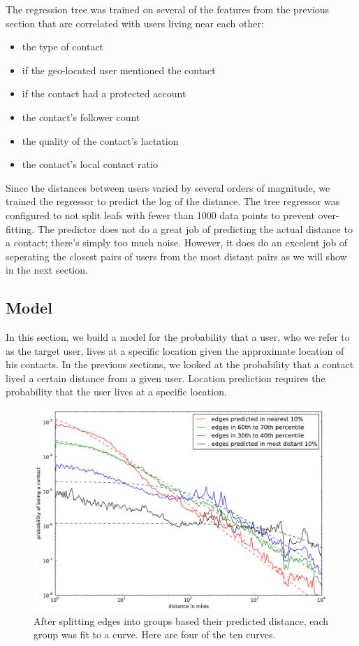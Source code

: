The regression tree was trained on several of the features from the previous
section that are correlated with users living near each other:
\begin{itemize}
\item the type of contact
\item if the geo-located user mentioned the contact
\item if the contact had a protected account
\item the contact's follower count
\item the quality of the contact's lactation
\item the contact's local contact ratio
\end{itemize}
%
Since the distances between users varied by several orders of magnitude, we
trained the regressor to predict the log of the distance.
%
The tree regressor was configured to not split leafs with fewer than 1000 data
points to prevent over-fitting.
%
The predictor does not do a great job of predicting the actual distance to a
contact; there's simply too much noise.
%
However, it does do an excelent job of seperating the closest pairs of users
from the most distant pairs as we will show in the next section.


\subsection{Model}
\label{sec:model}

In this section, we build a model for the probability that a user, who we refer
to as the target user, lives at a specific location given the approximate
location of his contacts.
%
In the previous sections, we looked at the probability that a contact lived a
certain distance from a given user.
%
Location prediction requires the probability that the user lives at a specific
location.


\begin{figure}[tb]
\centering
\includegraphics[width=\linewidth]{figures/near_prob_fit.pdf}
\caption{
After splitting edges into groups based their predicted distance, each group was fit to a curve. Here are four of the ten curves.
}
\label{fig:NearProbFit}
\end{figure}

